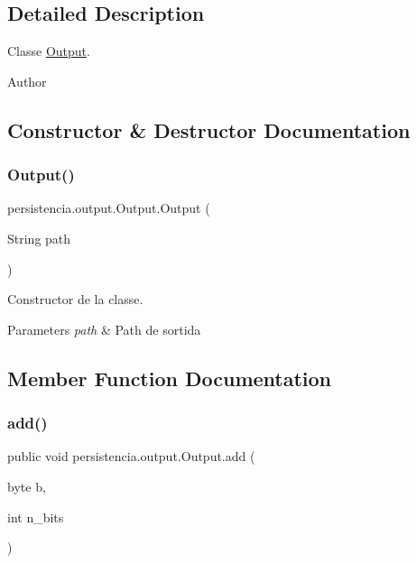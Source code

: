 \subsection{Detailed Description}
Classe \hyperlink{classpersistencia_1_1output_1_1Output}{Output}. 

\begin{DoxyAuthor}{Author}

\end{DoxyAuthor}


\subsection{Constructor \& Destructor Documentation}
\mbox{\label{classpersistencia_1_1output_1_1Output_acbb70ea9eabb2a6d0b2d7bd2f3c9009a}} 
\subsubsection{\texorpdfstring{Output()}{Output()}}
{\footnotesize\ttfamily persistencia.\+output.\+Output.\+Output (\begin{DoxyParamCaption}\item[{String}]{path }\end{DoxyParamCaption})\hspace{0.3cm}{\ttfamily [inline]}}



Constructor de la classe. 


\begin{DoxyParams}{Parameters}
{\em path} & Path de sortida \\
\hline
\end{DoxyParams}


\subsection{Member Function Documentation}
\mbox{\label{classpersistencia_1_1output_1_1Output_adc03a0dd7a94da21fe8432064a4eec09}} 
\subsubsection{\texorpdfstring{add()}{add()}}
{\footnotesize\ttfamily public void persistencia.\+output.\+Output.\+add (\begin{DoxyParamCaption}\item[{byte}]{b,  }\item[{int}]{n\+\_\+bits }\end{DoxyParamCaption})\hspace{0.3cm}{\ttfamily [inline]}}



